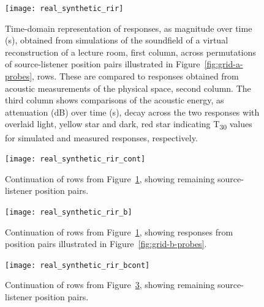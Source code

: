 \begin{figure}
    \centering
    \texttt{[image: real\_synthetic\_rir]}
    \caption[Ray tracing testing --- real and simulation impulse responses]{Time-domain representation of responses, as magnitude over time (s), obtained from simulations of the soundfield of a virtual reconstruction of a lecture room, first column, across permutations of source-listener position pairs illustrated in Figure~\ref{fig:grid-a-probes}, rows. These are compared to responses obtained from acoustic measurements of the physical space, second column. The third column shows comparisons of the acoustic energy, as attenuation (dB) over time (s), decay across the two responses with overlaid light, yellow star and dark, red star indicating T\textsubscript{30} values for simulated and measured responses, respectively.}
    \label{fig:rir-comparisons-grid-a}
\end{figure}
\begin{figure}
    \centering
    \texttt{[image: real\_synthetic\_rir\_cont]}
    \caption[]{Continuation of rows from Figure~\ref{fig:rir-comparisons-grid-a}, showing remaining source-listener position pairs.}
    \label{fig:rir-comparisons-grid-a2}
\end{figure}
\begin{figure}
    \centering
    \texttt{[image: real\_synthetic\_rir\_b]}
    \caption[]{Continuation of rows from Figure~\ref{fig:rir-comparisons-grid-a}, showing responses from position pairs illustrated in Figure~\ref{fig:grid-b-probes}.}
    \label{fig:rir-comparisons-grid-b}
\end{figure}
\begin{figure}
    \centering
    \texttt{[image: real\_synthetic\_rir\_bcont]}
    \caption[]{Continuation of rows from Figure~\ref{fig:rir-comparisons-grid-b}, showing remaining source-listener position pairs.}
    \label{fig:rir-comparisons-grid-b2}
\end{figure}

